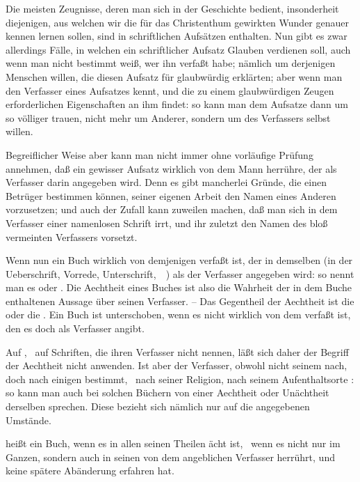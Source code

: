 \begin{aufza}
\item Die meisten Zeugnisse, deren man sich in der Geschichte bedient, insonderheit diejenigen, aus welchen wir die für das Christenthum gewirkten Wunder genauer kennen lernen sollen, sind in schriftlichen Aufsätzen enthalten. Nun gibt es zwar allerdings Fälle, in welchen ein schriftlicher Aufsatz Glauben verdienen soll, auch wenn man nicht bestimmt weiß, wer ihn verfaßt habe; nämlich um derjenigen Menschen willen, die diesen Aufsatz für glaubwürdig erklärten; aber wenn man den Verfasser eines Aufsatzes kennt, und die zu einem glaubwürdigen Zeugen erforderlichen Eigenschaften an ihm findet: so kann man dem Aufsatze dann um so völliger trauen, nicht mehr um Anderer, sondern um des Verfassers selbst willen.
\item  Begreiflicher Weise aber kann man nicht immer ohne vorläufige Prüfung annehmen, daß ein gewisser Aufsatz wirklich von dem Mann herrühre, der als Verfasser darin angegeben wird. Denn es gibt mancherlei Gründe, die einen Betrüger bestimmen können, seiner eigenen Arbeit den Namen eines Anderen vorzusetzen; und auch der Zufall kann zuweilen machen, daß man sich in dem Verfasser einer namenlosen Schrift irrt, und ihr zuletzt den Namen des bloß vermeinten Verfassers vorsetzt.
\item  Wenn nun ein Buch wirklich von demjenigen verfaßt ist, der in demselben (in der Ueberschrift, Vorrede, Unterschrift,~\ \udgl ) als der Verfasser angegeben wird: so nennt man es  oder . Die Aechtheit eines Buches ist also die Wahrheit der in dem Buche enthaltenen Aussage über seinen Verfasser. -- Das Gegentheil der Aechtheit ist die  oder die . Ein Buch ist unterschoben, wenn es nicht wirklich von dem verfaßt ist, den es doch als Verfasser angibt.
\begin{RWanm}
Auf , \dh\ auf Schriften, die ihren Verfasser nicht nennen, läßt sich daher der Begriff der Aechtheit nicht anwenden. Ist aber der Verfasser, obwohl nicht seinem  nach, doch nach einigen  bestimmt, \zB\ nach seiner Religion, nach seinem Aufenthaltsorte \udgl : so kann man auch bei solchen Büchern von einer Aechtheit oder Unächtheit derselben sprechen. Diese bezieht sich nämlich nur auf die angegebenen Umstände.
\end{RWanm}
\item  {} heißt ein Buch, wenn es in allen seinen Theilen ächt ist, \dh\ wenn es nicht nur im Ganzen, sondern auch in seinen  von dem angeblichen Verfasser herrührt, und keine spätere Abänderung erfahren hat.
\end{aufza}

